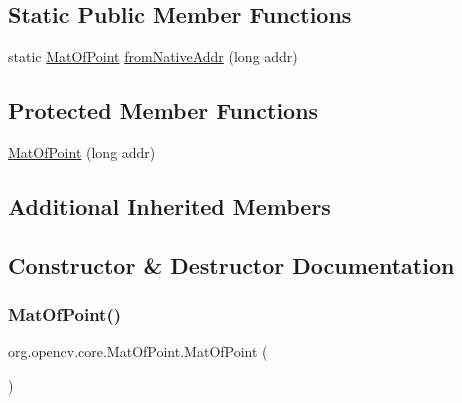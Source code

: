 \subsection*{Static Public Member Functions}
\begin{DoxyCompactItemize}
\item 
static \mbox{\hyperlink{classorg_1_1opencv_1_1core_1_1_mat_of_point}{Mat\+Of\+Point}} \mbox{\hyperlink{classorg_1_1opencv_1_1core_1_1_mat_of_point_ae9d8aa80b2ea1ad32a9a9ee9de5e4110}{from\+Native\+Addr}} (long addr)
\end{DoxyCompactItemize}
\subsection*{Protected Member Functions}
\begin{DoxyCompactItemize}
\item 
\mbox{\hyperlink{classorg_1_1opencv_1_1core_1_1_mat_of_point_acfa371e95c574b185bf2835e49159d52}{Mat\+Of\+Point}} (long addr)
\end{DoxyCompactItemize}
\subsection*{Additional Inherited Members}


\subsection{Constructor \& Destructor Documentation}
\mbox{\label{classorg_1_1opencv_1_1core_1_1_mat_of_point_aba1cad0331da2b6895f8b706999472be}} 
\subsubsection{\texorpdfstring{Mat\+Of\+Point()}{MatOfPoint()}\hspace{0.1cm}{\footnotesize\ttfamily [1/4]}}
{\footnotesize\ttfamily org.\+opencv.\+core.\+Mat\+Of\+Point.\+Mat\+Of\+Point (\begin{DoxyParamCaption}{ }\end{DoxyParamCaption})}

\mbox{\label{classorg_1_1opencv_1_1core_1_1_mat_of_point_acfa371e95c574b185bf2835e49159d52}} 
